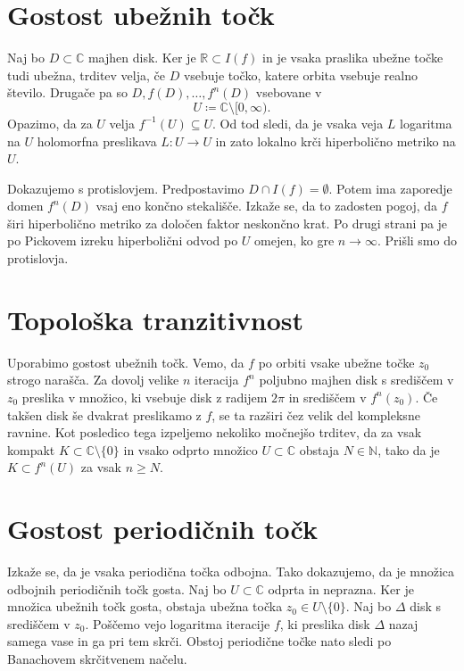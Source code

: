 \documentclass[a4paper, oneside]{amsart}
\newcommand{\NN}{\mathbb{N}}
\newcommand{\RR}{\mathbb{R}}
\newcommand{\CC}{\mathbb{C}}
\theoremstyle{plain}
\theoremstyle{definition}
\begin{document}
\section{Gostost ubežnih točk}
\noindent Naj bo \(D \subset \CC\) majhen disk. Ker je
\(\RR \subset I (f)\) in je vsaka praslika ubežne točke tudi ubežna, trditev
velja, če \(D\) vsebuje točko, katere orbita vsebuje realno število.
Drugače pa so \(D, f(D), \dots, f^n (D)\) vsebovane v
\[U \coloneq \CC \setminus [0, \infty).\]
Opazimo, da za \(U\) velja \(f^{-1} (U) \subseteq U\). Od tod sledi, da je vsaka
veja \(L\) logaritma na \(U\) holomorfna preslikava \(L \colon U \to U\) in zato
lokalno krči hiperbolično metriko na \(U\).

Dokazujemo s protislovjem. Predpostavimo \(D \cap I (f) = \emptyset\). Potem ima
zaporedje domen \(f^n (D)\) vsaj eno končno stekališče. Izkaže se, da to zadosten
pogoj, da \(f\) širi hiperbolično metriko za določen faktor neskončno krat.
Po drugi strani pa je po Pickovem izreku hiperbolični odvod po \(U\) omejen, ko
gre \(n \to \infty\). Prišli smo do protislovja.

\section{Topološka tranzitivnost}
\noindent Uporabimo gostost ubežnih točk. Vemo, da \(f\) po orbiti vsake ubežne
točke \(z_0\) strogo narašča. Za dovolj velike \(n\) iteracija \(f^n\) poljubno
majhen disk s središčem v \(z_0\) preslika v množico, ki vsebuje disk z radijem
\(2 \pi\) in središčem v \(f^n (z_0)\). Če takšen disk še dvakrat preslikamo
z \(f\), se ta razširi čez velik del kompleksne ravnine. Kot posledico tega
izpeljemo nekoliko močnejšo trditev, da za vsak kompakt
\(K \subset \CC \setminus \{0\}\) in vsako odprto množico \(U \subset \CC\)
obstaja \(N \in \NN\), tako da je \(K \subset f^n (U)\) za vsak \(n \geq N\).

\section{Gostost periodičnih točk}
\noindent Izkaže se, da je vsaka periodična točka odbojna. Tako dokazujemo, da
je množica odbojnih periodičnih točk gosta. Naj bo \(U \subset \CC\) odprta
in neprazna. Ker je množica ubežnih točk gosta, obstaja ubežna točka
\(z_0 \in U \setminus \{ 0 \}\). Naj bo \(\Delta\) disk s središčem
v \(z_0\). Poščemo vejo
logaritma iteracije \(f\), ki preslika disk \(\Delta\) nazaj samega vase in ga
pri tem skrči. Obstoj periodične točke nato sledi po Banachovem skrčitvenem načelu.
\end{document}
